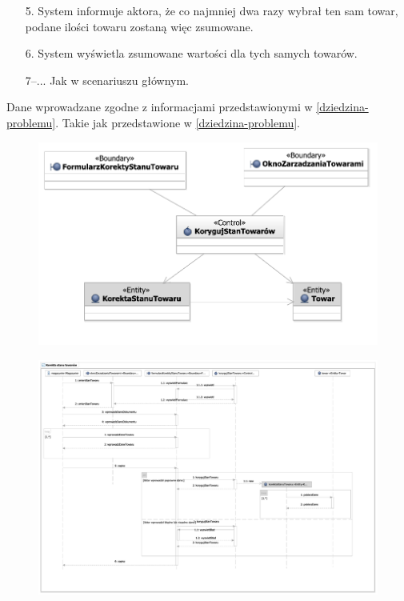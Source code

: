 \begin{usecase}
{\begin{enumerate}
       \item[5.] System informuje aktora, że co najmniej dwa razy wybrał ten sam towar, podane ilości towaru zostaną więc zsumowane.
       \item[6.] System wyświetla zsumowane wartości dla tych samych towarów.
       \item[7--...] Jak w scenariuszu głównym.
       \end{enumerate}
  }
   {
    Dane wprowadzane zgodne z informacjami przedstawionymi w \ref{dziedzina-problemu}.
  }
   {
    Takie jak przedstawione w \ref{dziedzina-problemu}.
  }
\end{usecase}

\begin{figure}[H]
  \centering
  \includegraphics[angle=\ecbangle, scale=\ecbscale]{../img/usecase/pu22ecb.pdf}
  \caption{}
\end{figure}
\newpage
\begin{figure}[H]
  \centering
  \includegraphics[angle=\seqangle, scale=0.40]{../img/usecase/pu22seq.pdf}
  \caption{}
\end{figure}
\newpage

